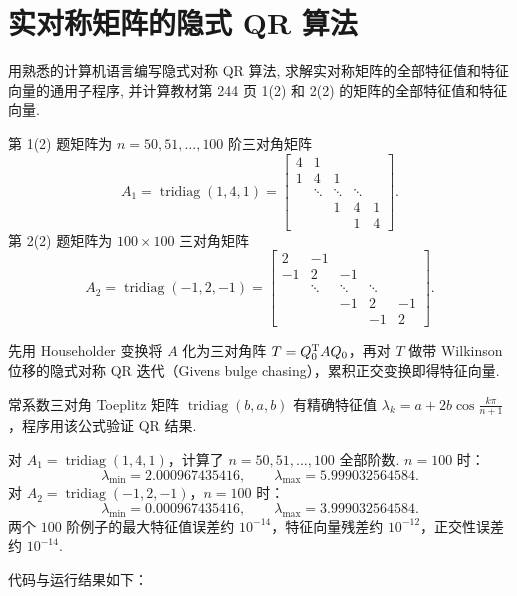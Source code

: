 \documentclass{article}
\newcommand{\tridiag}{\operatorname{tridiag}}
\begin{document}
\section{实对称矩阵的隐式 QR 算法}

用熟悉的计算机语言编写隐式对称 QR 算法, 求解实对称矩阵的全部特征值和特征向量的通用子程序,
并计算教材第 244 页 1(2) 和 2(2) 的矩阵的全部特征值和特征向量.

第 1(2) 题矩阵为 $n=50,51,\ldots,100$ 阶三对角矩阵
\[
  A_1 = \tridiag(1,4,1)
  =
  \begin{bmatrix}
    4 & 1 \\
    1 & 4 & 1 \\
    & \ddots & \ddots & \ddots \\
    &        & 1 & 4 & 1 \\
    &        &   & 1 & 4
  \end{bmatrix}.
\]
第 2(2) 题矩阵为 $100\times100$ 三对角矩阵
\[
  A_2 = \tridiag(-1,2,-1)
  =
  \begin{bmatrix}
    2 & -1 \\
    -1 & 2 & -1 \\
    & \ddots & \ddots & \ddots \\
    &        & -1 & 2 & -1 \\
    &        &    & -1 & 2
  \end{bmatrix}.
\]

\begin{solution}

  先用 Householder 变换将 $A$ 化为三对角阵 $T=Q_0^{\mathrm{T}} AQ_0$，再对 $T$ 做带 Wilkinson
  位移的隐式对称 QR 迭代（Givens bulge chasing），累积正交变换即得特征向量.

  常系数三对角 Toeplitz 矩阵 $\tridiag(b,a,b)$ 有精确特征值
  $\lambda_k=a+2b\cos\frac{k\pi}{n+1}$，程序用该公式验证 QR 结果.

  对 $A_1=\tridiag(1,4,1)$，计算了 $n=50,51,\ldots,100$ 全部阶数. $n=100$ 时：
  \[
    \lambda_{\min} = 2.000967435416,\qquad
    \lambda_{\max} = 5.999032564584.
  \]
  对 $A_2=\tridiag(-1,2,-1)$，$n=100$ 时：
  \[
    \lambda_{\min} = 0.000967435416,\qquad
    \lambda_{\max} = 3.999032564584.
  \]
  两个 $100$ 阶例子的最大特征值误差约 $10^{-14}$，特征向量残差约 $10^{-12}$，正交性误差约 $10^{-14}$.

  代码与运行结果如下：
  
  

\end{solution}
\end{document}
